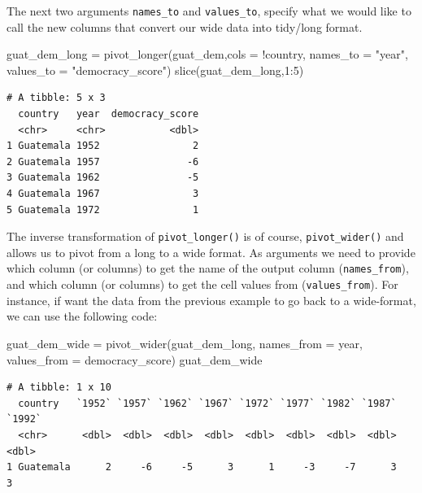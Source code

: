 \documentclass[
  letterpaper,
  DIV=11,
  numbers=noendperiod]{scrartcl}
\newenvironment{Shaded}{\begin{snugshade}}{\end{snugshade}}
\newcommand{\AttributeTok}[1]{\textcolor[rgb]{0.40,0.45,0.13}{#1}}
\newcommand{\DecValTok}[1]{\textcolor[rgb]{0.68,0.00,0.00}{#1}}
\newcommand{\FunctionTok}[1]{\textcolor[rgb]{0.28,0.35,0.67}{#1}}
\newcommand{\NormalTok}[1]{\textcolor[rgb]{0.00,0.23,0.31}{#1}}
\newcommand{\OtherTok}[1]{\textcolor[rgb]{0.00,0.23,0.31}{#1}}
\newcommand{\SpecialCharTok}[1]{\textcolor[rgb]{0.37,0.37,0.37}{#1}}
\newcommand{\StringTok}[1]{\textcolor[rgb]{0.13,0.47,0.30}{#1}}
\begin{document}
The next two arguments \texttt{names\_to} and \texttt{values\_to},
specify what we would like to call the new columns that convert our wide
data into tidy/long format.

\begin{Shaded}
\begin{Highlighting}[]
\NormalTok{guat\_dem\_long }\OtherTok{=} \FunctionTok{pivot\_longer}\NormalTok{(guat\_dem,}\AttributeTok{cols =} \SpecialCharTok{!}\NormalTok{country,}
                             \AttributeTok{names\_to =} \StringTok{"year"}\NormalTok{,}
                             \AttributeTok{values\_to =} \StringTok{"democracy\_score"}\NormalTok{)}
\FunctionTok{slice}\NormalTok{(guat\_dem\_long,}\DecValTok{1}\SpecialCharTok{:}\DecValTok{5}\NormalTok{)}
\end{Highlighting}
\end{Shaded}

\begin{verbatim}
# A tibble: 5 x 3
  country   year  democracy_score
  <chr>     <chr>           <dbl>
1 Guatemala 1952                2
2 Guatemala 1957               -6
3 Guatemala 1962               -5
4 Guatemala 1967                3
5 Guatemala 1972                1
\end{verbatim}

The inverse transformation of \texttt{pivot\_longer()} is of course,
\texttt{pivot\_wider()} and allows us to pivot from a long to a wide
format. As arguments we need to provide which column (or columns) to get
the name of the output column (\texttt{names\_from}), and which column
(or columns) to get the cell values from (\texttt{values\_from}). For
instance, if want the data from the previous example to go back to a
wide-format, we can use the following code:

\begin{Shaded}
\begin{Highlighting}[]
\NormalTok{guat\_dem\_wide }\OtherTok{=} \FunctionTok{pivot\_wider}\NormalTok{(guat\_dem\_long,}
                            \AttributeTok{names\_from =}\NormalTok{ year, }
                            \AttributeTok{values\_from =}\NormalTok{ democracy\_score)}
\NormalTok{guat\_dem\_wide}
\end{Highlighting}
\end{Shaded}

\begin{verbatim}
# A tibble: 1 x 10
  country   `1952` `1957` `1962` `1967` `1972` `1977` `1982` `1987` `1992`
  <chr>      <dbl>  <dbl>  <dbl>  <dbl>  <dbl>  <dbl>  <dbl>  <dbl>  <dbl>
1 Guatemala      2     -6     -5      3      1     -3     -7      3      3
\end{verbatim}
\end{document}
